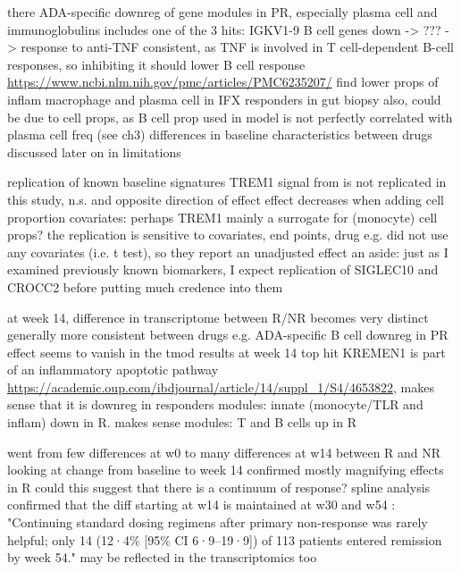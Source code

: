 \begin{outline}
\1 there ADA-specific downreg of gene modules in PR, especially plasma cell and immunoglobulins
    \2 includes one of the 3 hits: IGKV1-9
    \2 B cell genes down -> ??? -> response to anti-TNF
        \3 consistent, as TNF is involved in T cell-dependent B-cell responses, so inhibiting it should lower B cell response \url{https://www.ncbi.nlm.nih.gov/pmc/articles/PMC6235207/}
    \2 \textcite{gaujoux2019CellcentredMetaanalysisReveals} find lower props of inflam macrophage and plasma cell in IFX responders in gut biopsy
    \2 also, could be due to cell props, as B cell prop used in model is not perfectly correlated with plasma cell freq (see ch3)
    \2 differences in baseline characteristics between drugs discussed later on in limitations

\1 replication of known baseline signatures
    \2 TREM1 signal from \textcite{verstockt2019LowTREM1Expression} is not replicated in this study, n.s. and opposite direction of effect
    \2 effect decreases when adding cell proportion covariates: perhaps TREM1 mainly a surrogate for (monocyte) cell props?
    \2 the replication is sensitive to covariates, end points, drug
        \3 e.g. \textcite{verstockt2019LowTREM1Expression} did not use any covariates (i.e. t test), so they report an unadjusted effect
    \2 an aside: just as I examined previously known biomarkers, I expect replication of SIGLEC10 and CROCC2 before putting much credence into them

\1 at week 14, difference in transcriptome between R/NR becomes very distinct
    \2 generally more consistent between drugs
        \3 e.g. ADA-specific B cell downreg in PR effect seems to vanish in the tmod results at week 14
    \2 top hit KREMEN1 is part of an inflammatory apoptotic pathway \url{https://academic.oup.com/ibdjournal/article/14/suppl_1/S4/4653822}, makes sense that it is downreg in responders
    \2 modules: innate (monocyte/TLR and inflam) down in R. makes sense
    \2 modules: T and B cells up in R 

\1 went from few differences at w0 to many differences at w14 between R and NR
    \2 looking at change from baseline to week 14 confirmed mostly magnifying effects in R
        \3 could this suggest that there is a continuum of response?
    \2 spline analysis confirmed that the diff starting at w14 is maintained at w30 and w54
    \2 \autocite{kennedy2019PredictorsAntiTNFTreatment}: "Continuing standard dosing regimens after primary non-response was rarely helpful; only 14 (12·4\% [95\% CI 6·9–19·9]) of 113 patients entered remission by week 54."
        \3 may be reflected in the transcriptomics too


\end{outline}
